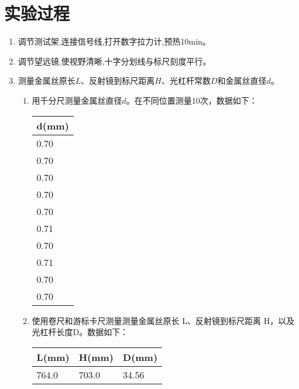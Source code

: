 \documentclass[UTF8]{ctexart}
\begin{document}
\section{实验过程}
\begin{enumerate}
    \item 调节测试架,连接信号线,打开数字拉力计,预热10min。
    \item 调节望远镜,使视野清晰,十字分划线与标尺刻度平行。
    \item 测量金属丝原长$L$、反射镜到标尺距离$H$、光杠杆常数$D$和金属丝直径$d$。
    \begin{enumerate}
        \item 用千分尺测量金属丝直径$d$。在不同位置测量10次，数据如下：
        \\
        \begin{table}[htbp]
        \centering
        \begin{tabular}{|l|}
        \hline
        d(mm)\\
        \hline
        0.70\\
        \hline
        0.70\\
        \hline
        0.70\\
        \hline
        0.70\\
        \hline
        0.70\\
        \hline
        0.71\\
        \hline
        0.70\\
        \hline
        0.71\\
        \hline
        0.70\\
        \hline
        0.70\\
        \hline
        \end{tabular}
        \end{table}
        \item 使用卷尺和游标卡尺测量测量金属丝原长 L、反射镜到标尺距离 H，以及光杠杆长度D。数据如下：   
        \\
        \begin{table}[htbp]
        \centering
    \begin{tabular}{|l|l|l|}
        \hline
    L(mm)&H(mm)&D(mm)\\
    \hline
    764.0&703.0&34.56\\
    \hline
    \end{tabular}
    \end{table}


\end{enumerate}
\end{enumerate}
\end{document}
